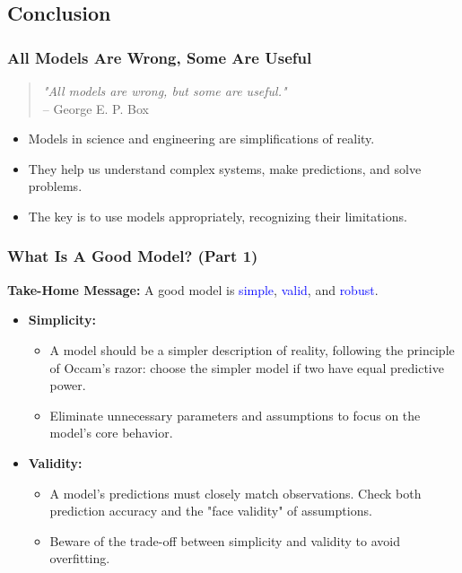 \documentclass{beamer}
\begin{document}
\subsection{Conclusion}
\begin{frame}
\frametitle{All Models Are Wrong, Some Are Useful}
\begin{quote}
    \emph{"All models are wrong, but some are useful."} \\
    \hfill -- George E. P. Box
\end{quote}

\begin{itemize}
    \item Models in science and engineering are simplifications of reality.
    \item They help us understand complex systems, make predictions, and solve problems.
    \item The key is to use models appropriately, recognizing their limitations.
\end{itemize}
\end{frame}
%
\begin{frame}
\frametitle{What Is A Good Model? (Part 1)}
\textbf{Take-Home Message:} A good model is \textcolor{blue}{simple}, \textcolor{blue}{valid}, and \textcolor{blue}{robust}.

\small
\begin{itemize}
    \item \textbf{Simplicity:} 
    \begin{itemize}
        \item A model should be a simpler description of reality, following the principle of Occam's razor: choose the simpler model if two have equal predictive power.
        \item Eliminate unnecessary parameters and assumptions to focus on the model's core behavior.
    \end{itemize}
    \item \textbf{Validity:}
    \begin{itemize}
        \item A model's predictions must closely match observations. Check both prediction accuracy and the "face validity" of assumptions.
        \item Beware of the trade-off between simplicity and validity to avoid overfitting.
    \end{itemize}
\end{itemize}
\end{frame}
%
\end{document}
